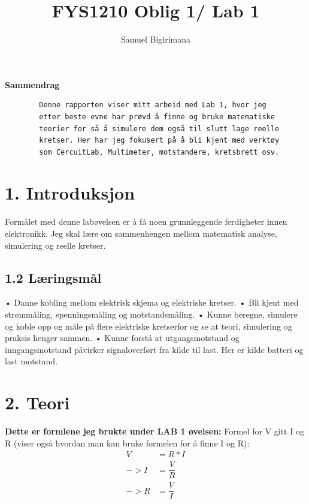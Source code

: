 \documentclass{article}
\title{FYS1210 Oblig 1/ Lab 1}
\author{Samuel Bigirimana}
\begin{document}
    \maketitle
    \textbf{Sammendrag}
    \begin{verbatim}
        Denne rapporten viser mitt arbeid med Lab 1, hvor jeg 
        etter beste evne har prøvd å finne og bruke matematiske 
        teorier for så å simulere dem også til slutt lage reelle 
        kretser. Her har jeg fokusert på å bli kjent med verktøy 
        som CercuitLab, Multimeter, motstandere, kretsbrett osv.
    \end{verbatim}

    \raggedright
    \section*{1. Introduksjon}
        Formålet med denne labøvelsen er å få noen grunnleggende 
        ferdigheter innen elektronikk. Jeg skal lære om sammenhengen mellom matematisk  
        analyse, simulering  og  reelle  kretser.
    
    \subsection*{1.2 Læringsmål}
        • Danne kobling mellom elektrisk skjema og elektriske kretser. \linebreak
        • Bli kjent med strømmåling, spenningsmåling og motstandsmåling. \linebreak
        • Kunne beregne, simulere og koble opp og måle på flere elektriske
        kretserfor og se at teori, simulering og praksis henger sammen. \linebreak
        • Kunne  forstå at utgangsmotstand og inngangsmotstand påvirker 
        signaloverført fra kilde til last. Her er kilde batteri og last 
        motstand.
    \pagebreak

    \section*{2. Teori}
        \textbf{Dette er formlene jeg brukte under LAB 1 øvelsen:} \linebreak
        Formel for V gitt I og R (viser også hvordan man kan bruke formelen for å finne I og R):
        \begin{equation}
            \begin{split}
                V &= R * I \\
                -> I &= \dfrac{V}{R} \\
                -> R &= \dfrac{V}{I}
            \end{split}
        \end{equation}
\end{document}
